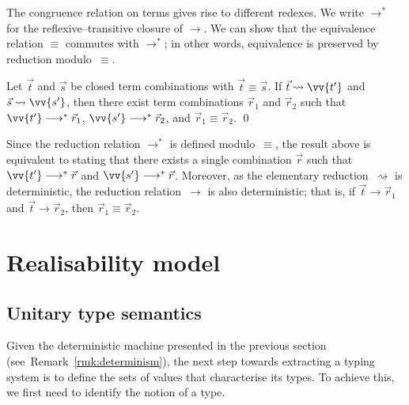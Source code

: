 \documentclass[a4paper,UKenglish,numberwithinsect,pdfa,anonymous]{lipics-v2021}
\theoremstyle{restatestyle}
\newcommand\lra{\longrightarrow}
\def\lraneq{\rightsquigarrow}
\def\eval{\lra^*}
\begin{document}
The congruence relation on terms gives rise to different redexes. We write
$\eval$ for the reflexive–transitive closure of $\lra$. We can show that the
equivalence relation $\equiv$ commutes with $\eval$; in other words,
equivalence is preserved by reduction modulo~$\equiv$.

\begin{theorem}\label{thm:confluence}
  Let $\vec{t}$ and $\vec{s}$ be closed term combinations with
  $\vec{t}\equiv\vec{s}$. If $\vec{t}\lraneq\vv{t'}$ and $\vec{s}\lraneq\vv{s'}$,
  then there exist term combinations $\vec{r}_{1}$ and $\vec{r}_{2}$ such that
  $\vv{t'}\eval\vec{r}_{1}$, $\vv{s'}\eval\vec{r}_{2}$, and
  $\vec{r}_{1}\equiv\vec{r}_{2}$.
  \qed
\end{theorem}

\begin{remark}\label{rmk:determinism}
  Since the reduction relation $\eval$ is defined modulo~$\equiv$, the result
  above is equivalent to stating that there exists a single combination
  $\vec{r}$ such that $\vv{t'}\eval\vec{r}$ and $\vv{s'}\eval\vec{r}$.
  Moreover, as the elementary reduction~$\lraneq$ is deterministic, the
  reduction relation~$\lra$ is also deterministic; that is, if
  $\vec{t}\lra\vec{r}_{1}$ and $\vec{t}\lra\vec{r}_{2}$, then
  $\vec{r}_{1}\equiv\vec{r}_{2}$.
\end{remark}


\section{Realisability model}\label{sec:model}
\subsection{Unitary type semantics}
Given the deterministic machine presented in the previous section
(see~Remark~\ref{rmk:determinism}), the next
step towards extracting a typing system is to define the sets of values that
characterise its types. To achieve this, we first need to identify the notion
of a type.
\end{document}
